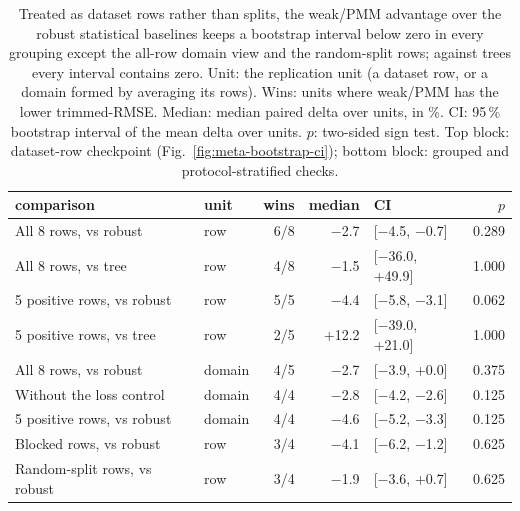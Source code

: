 \begin{table}[H]
\centering
\caption{Treated as dataset rows rather than splits, the weak/PMM advantage over the robust statistical baselines keeps a bootstrap interval below zero in every grouping except the all-row domain view and the random-split rows; against trees every interval contains zero. Unit: the replication unit (a dataset row, or a domain formed by averaging its rows). Wins: units where weak/PMM has the lower trimmed-RMSE. Median: median paired delta over units, in \%. CI: 95\,\% bootstrap interval of the mean delta over units. \(p\): two-sided sign test. Top block: dataset-row checkpoint (Fig.~\ref{fig:meta-bootstrap-ci}); bottom block: grouped and protocol-stratified checks.}
\label{tab:row-inference}
\small
\begin{tabular}{@{}llrrlr@{}}
\toprule
comparison & unit & wins & median & CI & \(p\) \\
\midrule
All 8 rows, vs robust & row & 6/8 & $-$2.7 & [$-$4.5, $-$0.7] & 0.289 \\
All 8 rows, vs tree & row & 4/8 & $-$1.5 & [$-$36.0, +49.9] & 1.000 \\
5 positive rows, vs robust & row & 5/5 & $-$4.4 & [$-$5.8, $-$3.1] & 0.062 \\
5 positive rows, vs tree & row & 2/5 & +12.2 & [$-$39.0, +21.0] & 1.000 \\
\midrule
All 8 rows, vs robust & domain & 4/5 & $-$2.7 & [$-$3.9, +0.0] & 0.375 \\
Without the loss control & domain & 4/4 & $-$2.8 & [$-$4.2, $-$2.6] & 0.125 \\
5 positive rows, vs robust & domain & 4/4 & $-$4.6 & [$-$5.2, $-$3.3] & 0.125 \\
Blocked rows, vs robust & row & 3/4 & $-$4.1 & [$-$6.2, $-$1.2] & 0.625 \\
Random-split rows, vs robust & row & 3/4 & $-$1.9 & [$-$3.6, +0.7] & 0.625 \\
\bottomrule
\end{tabular}
\end{table}
